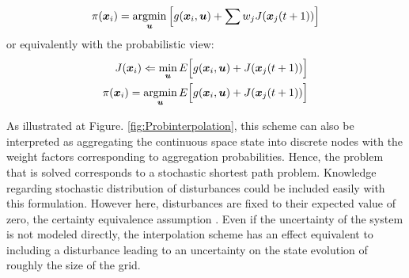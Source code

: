 %
\begin{align}
\pi(\boldsymbol{x}_i) = \operatornamewithlimits{argmin}\limits_{\boldsymbol{u}} 
\left[ g(\boldsymbol{x}_i,\boldsymbol{u}) + \sum{ w_j J(\boldsymbol{x}_j(t+1))}  \right]
\end{align}
%
or equivalently with the probabilistic view:
%
\begin{align}
J(\boldsymbol{x}_i) \Leftarrow \operatornamewithlimits{min}\limits_{\boldsymbol{u}} E \Big[ g(\boldsymbol{x}_i,\boldsymbol{u}) + J(\boldsymbol{x}_j(t+1))  \Big] \\
\pi(\boldsymbol{x}_i) = \operatornamewithlimits{argmin}\limits_{\boldsymbol{u}}  E \Big[ g(\boldsymbol{x}_i,\boldsymbol{u}) + J(\boldsymbol{x}_j(t+1))  \Big]
\end{align}



As illustrated at Figure. \ref{fig:Probinterpolation}, this scheme can also be interpreted as aggregating the continuous space state into discrete nodes with the weight factors corresponding to aggregation probabilities. Hence, the problem that is solved corresponds to a stochastic shortest path problem. Knowledge regarding stochastic distribution of disturbances could be included easily with this formulation. However here, disturbances are fixed to their expected value of zero, the certainty equivalence assumption \cite{bertsekas_dynamic_2000}. Even if the uncertainty of the system is not modeled directly, the interpolation scheme has an effect equivalent to including a disturbance leading to an uncertainty on the state evolution of roughly the size of the grid.


%

